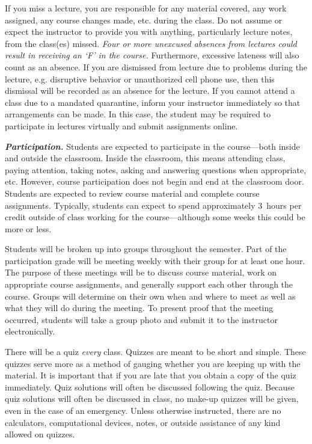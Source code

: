 \documentclass[11pt,letterpaper]{article}
\begin{document}
If you miss a lecture, you are responsible for any material covered, any work assigned, any course changes made, etc. during the class. Do not assume or expect the instructor to provide you with anything, particularly lecture notes, from the class(es) missed. {\itshape Four or more unexcused absences from lectures could result in receiving an `F' in the course.} Furthermore, excessive lateness will also count as an absence. If you are dismissed from lecture due to problems during the lecture, e.g. disruptive behavior or unauthorized cell phone use, then this dismissal will be recorded as an absence for the lecture. If you cannot attend a class due to a mandated quarantine, inform your instructor immediately so that arrangements can be made. In this case, the student may be required to participate in lectures virtually and submit assignments online. \pspace

{\itshape\bfseries\color{stacred}Participation.} 
Students are expected to participate in the course---both inside and outside the classroom. Inside the classroom, this means attending class, paying attention, taking notes, asking and answering questions when appropriate, etc. However, course participation does not begin and end at the classroom door. Students are expected to review course material and complete course assignments. Typically, students can expect to spend approximately 3~hours per credit outside of class working for the course---although some weeks this could be more or less. \pspace

Students will be broken up into groups throughout the semester. Part of the participation grade will be meeting weekly with their group for at least one hour. The purpose of these meetings will be to discuss course material, work on appropriate course assignments, and generally support each other through the course. Groups will determine on their own when and where to meet as well as what they will do during the meeting. To present proof that the meeting occurred, students will take a group photo and submit it to the instructor electronically. 
\sectionbreak



There will be a quiz \textit{every} class. Quizzes are meant to be short and simple. These quizzes serve more as a method of gauging whether you are keeping up with the material. It is important that if you are late that you obtain a copy of the quiz immediately. Quiz solutions will often be discussed following the quiz. Because quiz solutions will often be discussed in class, no make-up quizzes will be given, even in the case of an emergency. Unless otherwise instructed, there are no calculators, computational devices, notes, or outside assistance of any kind allowed on quizzes. 
\sectionbreak
\end{document}
